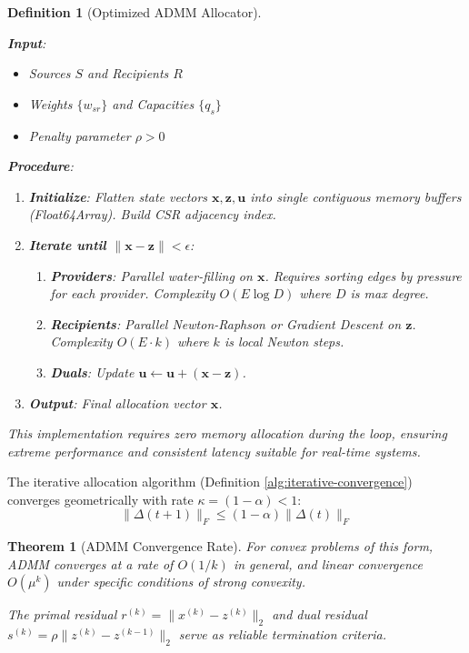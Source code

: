 \documentclass[11pt]{article}
\newtheorem{definition}{Definition}
\newtheorem{theorem}{Theorem}
\begin{document}
\begin{definition}[Optimized ADMM Allocator]
\label{alg:admm-allocation}

\textbf{Input}: 
\begin{itemize}
\item Sources $S$ and Recipients $R$
\item Weights $\{w_{sr}\}$ and Capacities $\{q_s\}$
\item Penalty parameter $\rho > 0$
\end{itemize}

\textbf{Procedure}:
\begin{enumerate}
    \item \textbf{Initialize}: Flatten state vectors $\mathbf{x}, \mathbf{z}, \mathbf{u}$ into single contiguous memory buffers (Float64Array). Build CSR adjacency index.
    \item \textbf{Iterate until $\|\mathbf{x} - \mathbf{z}\| < \epsilon$}:
    \begin{enumerate}
        \item \textbf{Providers}: Parallel water-filling on $\mathbf{x}$. Requires sorting edges by pressure for each provider. Complexity $O(E \log D)$ where $D$ is max degree.
        \item \textbf{Recipients}: Parallel Newton-Raphson or Gradient Descent on $\mathbf{z}$. Complexity $O(E \cdot k)$ where $k$ is local Newton steps.
        \item \textbf{Duals}: Update $\mathbf{u} \leftarrow \mathbf{u} + (\mathbf{x} - \mathbf{z})$.
    \end{enumerate}
    \item \textbf{Output}: Final allocation vector $\mathbf{x}$.
\end{enumerate}

This implementation requires zero memory allocation during the loop, ensuring extreme performance and consistent latency suitable for real-time systems.
\end{definition}
\label{thm:convergence-rate}
The iterative allocation algorithm (Definition \ref{alg:iterative-convergence}) converges geometrically with rate $\kappa = (1-\alpha) < 1$:
\[
\|\Delta(t+1)\|_F \leq (1-\alpha) \|\Delta(t)\|_F
\]
\begin{theorem}[ADMM Convergence Rate]
\label{thm:convergence-rate}
For convex problems of this form, ADMM converges at a rate of $O(1/k)$ in general, and linear convergence $O(\mu^k)$ under specific conditions of strong convexity.

The primal residual $r^{(k)} = \|x^{(k)} - z^{(k)}\|_2$ and dual residual $s^{(k)} = \rho \|z^{(k)} - z^{(k-1)}\|_2$ serve as reliable termination criteria.
\end{theorem}
\end{document}
